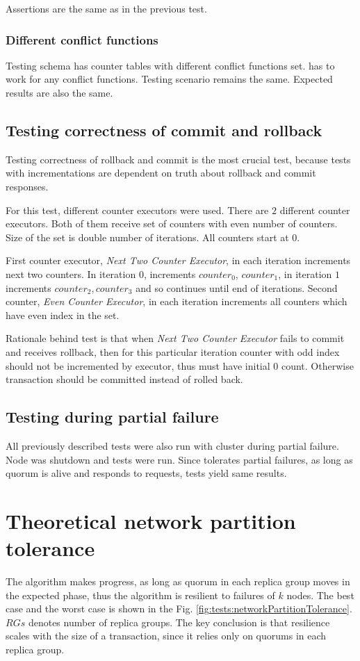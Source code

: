 Assertions are the same as in the previous test.

\subsubsection{Different conflict functions}
Testing schema has counter tables with different conflict functions set. \mpt has to work for any conflict functions. Testing scenario remains the same. Expected results are also the same.

\subsection{Testing correctness of commit and rollback}
Testing correctness of rollback and commit is the most crucial test, because tests with incrementations are dependent on truth about rollback and commit responses.

For this test, different counter executors were used. There are $2$ different counter executors. Both of them receive set of counters with even number of counters. Size of the set is double number of iterations. All counters start at $0$.

First counter executor, \emph{Next Two Counter Executor}, in each iteration increments next two counters. In iteration $0$, increments $counter_{0}$, $counter_{1}$, in iteration $1$ increments $counter_{2}, counter_{3}$ and so continues until end of iterations. Second counter, \emph{Even Counter Executor}, in each iteration increments all counters which have even index in the set.

Rationale behind test is that when \emph{Next Two Counter Executor} fails to commit and receives rollback, then for this particular iteration counter with odd index should not be incremented by executor, thus must have initial $0$ count. Otherwise transaction should be committed instead of rolled back.

\subsection{Testing during partial failure}

All previously described tests were also run with cluster during partial failure. Node was shutdown and tests were run. Since \mpt tolerates partial failures, as long as quorum is alive and responds to requests, tests yield same results.

\section{Theoretical network partition tolerance}
The algorithm makes progress, as long as quorum in each replica group moves in the expected phase, thus the algorithm is resilient to failures of $k$ nodes. The best case and the worst case is shown in the Fig. \ref{fig:tests:networkPartitionTolerance}. $RGs$ denotes number of replica groups. The key conclusion is that resilience scales with the size of a transaction, since it relies only on quorums in each replica group.

